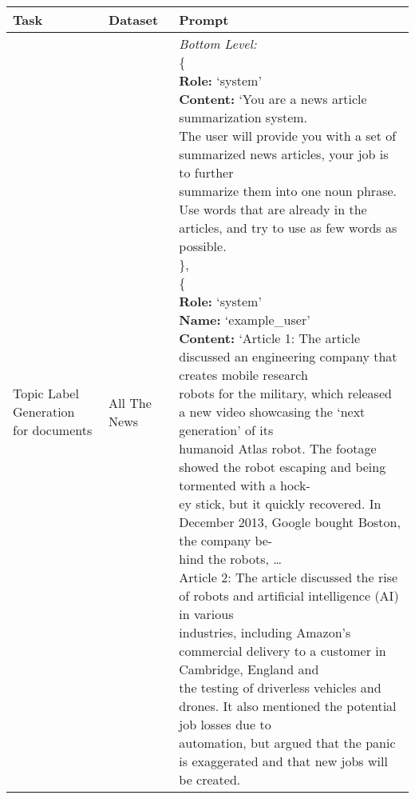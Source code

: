 \clearpage
\begin{center}
  \begin{tabular}{ | p{3.0cm} | p{3.0cm} | p{13cm} | }
    \hline
    \textbf{Task} & \textbf{Dataset} & \textbf{Prompt}\\
    \hline
    \makecell[tl]{Topic Label Generation \\ for documents}  & All The News & \makecell[tl]{
    \textit{{Bottom Level:}} \\
    \{\\
    \quad\textbf{Role:} `system'\\
    \quad\textbf{Content:} `You are a news article summarization system.  \\
    \quad The user will provide you with a set of summarized news articles, your job is to further \\
    \quad summarize them into one noun phrase. \\
    \quad Use words that are already in the articles, and try to use as few words as possible.\\
    \},\\
    \{\\
    \quad\textbf{Role:} `system'\\
    \quad\textbf{Name:} `example\_user'\\ 
    \quad\textbf{Content:} `Article 1: The article discussed an engineering company that creates mobile research\\
    \quad robots for the military, which released a new video showcasing the `next generation' of its\\
    \quad humanoid Atlas robot. The footage showed the robot escaping and being tormented with a hock-\\
    \quad ey stick, but it quickly recovered. In December 2013, Google bought Boston, the company be-\\
    \quad hind the robots, \dots \\ 
    \quad Article 2: The article discussed the rise of robots and artificial intelligence (AI) in various\\
    \quad industries, including Amazon's commercial delivery to a customer in Cambridge, England and\\
    \quad the testing of driverless vehicles and drones. It also mentioned the potential job losses due to \\
    \quad automation, but argued that the panic is exaggerated and that new jobs will be created. \\
}
\end{tabular}
\end{center}
